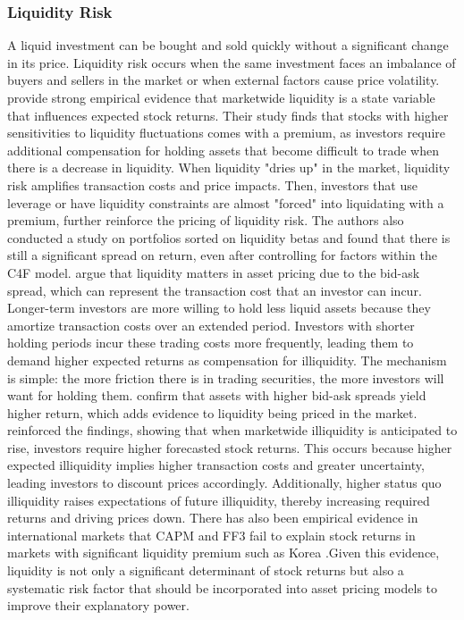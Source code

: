
\subsubsection{Liquidity Risk}
A liquid investment can be bought and sold quickly without a significant change in its price. Liquidity risk occurs when the same investment faces an imbalance of buyers and sellers in the market or when external factors cause price volatility.  provide strong empirical evidence that marketwide liquidity is a state variable that influences expected stock returns. Their study finds that stocks with higher sensitivities to liquidity fluctuations comes with a premium, as investors require additional compensation for holding assets that become difficult to trade when there is a decrease in liquidity. When liquidity "dries up" in the market, liquidity risk amplifies transaction costs and price impacts. Then, investors that use leverage or have liquidity constraints are almost "forced" into liquidating with a premium, further reinforce the pricing of liquidity risk. The authors also conducted a study on portfolios sorted on liquidity betas and found that there is still a significant spread on return, even after controlling for factors within the C4F model.  argue that liquidity matters in asset pricing due to the bid-ask spread, which can represent the transaction cost that an investor can incur. Longer-term investors are more willing to hold less liquid assets because they amortize transaction costs over an extended period. Investors with shorter holding periods incur these trading costs more frequently, leading them to demand higher expected returns as compensation for illiquidity. The mechanism is simple: the more friction there is in trading securities, the more investors will want for holding them. confirm that assets with higher bid-ask spreads yield higher return, which adds evidence to liquidity being priced in the market.  reinforced the findings, showing that when marketwide illiquidity is anticipated to rise, investors require higher forecasted stock returns. This occurs because higher expected illiquidity implies higher transaction costs and greater uncertainty, leading investors to discount prices accordingly. Additionally, higher status quo illiquidity raises expectations of future illiquidity, thereby increasing required returns and driving prices down. There has also been empirical evidence in international markets that CAPM and FF3 fail to explain stock returns in markets with significant liquidity premium such as Korea \cite{jang_2012}.Given this evidence, liquidity is not only a significant determinant of stock returns but also a systematic risk factor that should be incorporated into asset pricing models to improve their explanatory power.


